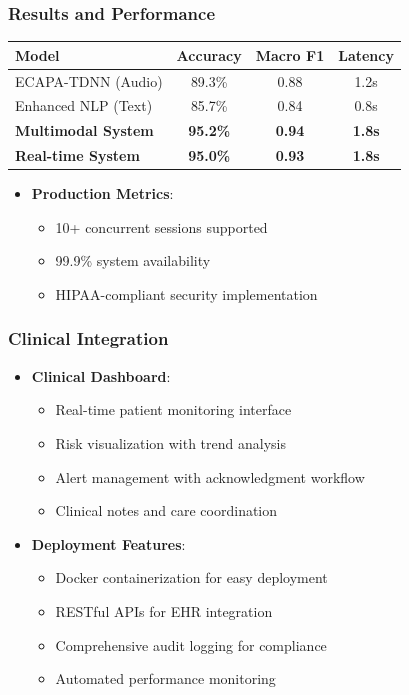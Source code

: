 \documentclass{beamer}
\begin{document}
\begin{frame}
\frametitle{Results and Performance}
\begin{table}
\centering
\begin{tabular}{lccc}
\toprule
\textbf{Model} & \textbf{Accuracy} & \textbf{Macro F1} & \textbf{Latency} \\
\midrule
ECAPA-TDNN (Audio) & 89.3\% & 0.88 & 1.2s \\
Enhanced NLP (Text) & 85.7\% & 0.84 & 0.8s \\
\textbf{Multimodal System} & \textbf{95.2\%} & \textbf{0.94} & \textbf{1.8s} \\
\textbf{Real-time System} & \textbf{95.0\%} & \textbf{0.93} & \textbf{1.8s} \\
\bottomrule
\end{tabular}
\end{table}

\begin{itemize}
    \item \textbf{Production Metrics}:
    \begin{itemize}
        \item 10+ concurrent sessions supported
        \item 99.9\% system availability
        \item HIPAA-compliant security implementation
    \end{itemize}
\end{itemize}
\end{frame}

\begin{frame}
\frametitle{Clinical Integration}
\begin{itemize}
    \item \textbf{Clinical Dashboard}:
    \begin{itemize}
        \item Real-time patient monitoring interface
        \item Risk visualization with trend analysis
        \item Alert management with acknowledgment workflow
        \item Clinical notes and care coordination
    \end{itemize}
    \item \textbf{Deployment Features}:
    \begin{itemize}
        \item Docker containerization for easy deployment
        \item RESTful APIs for EHR integration
        \item Comprehensive audit logging for compliance
        \item Automated performance monitoring
    \end{itemize}
\end{itemize}
\end{frame}
\end{document}
